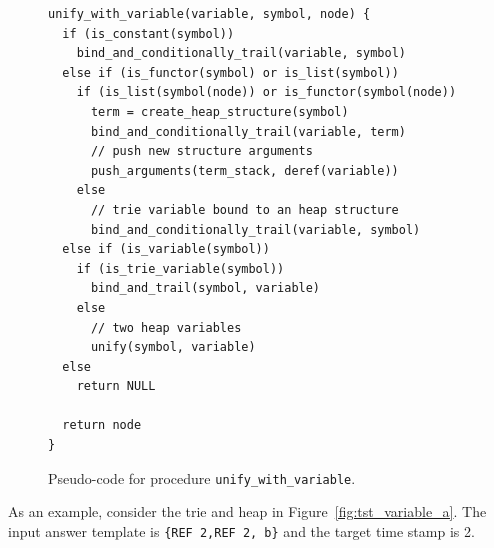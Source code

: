 \begin{figure}[ht]
\begin{Verbatim}
unify_with_variable(variable, symbol, node) {
  if (is_constant(symbol))
    bind_and_conditionally_trail(variable, symbol)
  else if (is_functor(symbol) or is_list(symbol))
    if (is_list(symbol(node)) or is_functor(symbol(node))
      term = create_heap_structure(symbol)
      bind_and_conditionally_trail(variable, term)
      // push new structure arguments
      push_arguments(term_stack, deref(variable))
    else
      // trie variable bound to an heap structure
      bind_and_conditionally_trail(variable, symbol)
  else if (is_variable(symbol))
    if (is_trie_variable(symbol))
      bind_and_trail(symbol, variable)
    else
      // two heap variables
      unify(symbol, variable)
  else
    return NULL
  
  return node
}
\end{Verbatim}
\caption{Pseudo-code for procedure \texttt{unify\_with\_variable}.}
\label{fig:unify_with_variable}
\end{figure}

As an example, consider the trie and heap in Figure~\ref{fig:tst_variable_a}.
The input answer template is \texttt{\{REF~2,REF~2,~b\}} and the target time stamp is 2.

